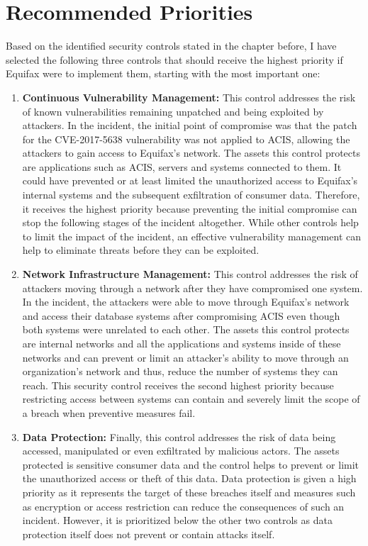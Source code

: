 \chapter{Recommended Priorities}
Based on the identified security controls stated in the chapter before, I have selected the following three controls that should receive the highest priority if Equifax were to implement them, starting with the most important one:
\begin{enumerate}
\item \textbf{Continuous Vulnerability Management:} This control addresses the risk  of known vulnerabilities remaining unpatched and being exploited by attackers. In the incident, the initial point of compromise was that the patch for the CVE-2017-5638 vulnerability was not applied to ACIS, allowing the attackers to gain access to Equifax's network. The assets this control protects are applications such as ACIS, servers and systems connected to them. It could have prevented or at least limited the unauthorized access to Equifax's internal systems and the subsequent exfiltration of consumer data. Therefore, it receives the highest priority because preventing the initial compromise can stop the following stages of the incident altogether. While other controls help to limit the impact of the incident, an effective vulnerability management can help to eliminate threats before they can be exploited.
\item \textbf{Network Infrastructure Management:} This control addresses the risk of attackers moving through a network after they have compromised one system. In the incident, the attackers were able to move through Equifax's network and access their database systems after compromising ACIS even though both systems were unrelated to each other. The assets this control protects are internal networks and all the applications and systems inside of these networks and can prevent or limit an attacker's ability to move through an organization's network and thus, reduce the number of systems they can reach. This security control receives the second highest priority because restricting access between systems can contain and severely limit the scope of a breach when preventive measures fail.
\item \textbf{Data Protection:} Finally, this control addresses the risk of data being accessed, manipulated or even exfiltrated by malicious actors. The assets protected  is sensitive consumer data and the control helps to prevent or limit the unauthorized access or theft of this data. Data protection is given a high priority as it represents the target of these breaches itself and measures such as encryption or access restriction can reduce the consequences of such an incident. However, it is prioritized below the other two controls as data protection itself does not prevent or contain attacks itself.
\end{enumerate}
